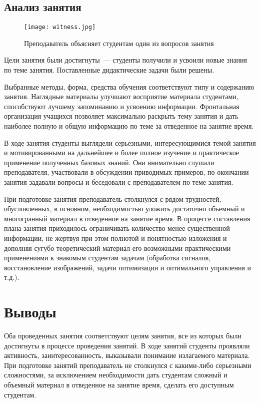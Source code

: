 \begin{refsection}
\subsection{Анализ занятия}

    \begin{figure}[h]
        \centering
        \texttt{[image: witness.jpg]}
        \caption{Преподаватель объясняет студентам один из вопросов занятия}
    \end{figure}

    Цели занятия были достигнуты~--- студенты получили и усвоили новые знания по теме занятия. Поставленные дидактические задачи были решены.

    Выбранные методы, форма, средства обучения соответствуют типу и содержанию занятия. Наглядные материалы улучшают восприятие материала студентами, способствуют лучшему запоминанию и усвоению информации. Фронтальная организация учащихся позволяет максимально раскрыть тему занятия и дать наиболее полную и общую информацию по теме за отведенное на занятие время.

    В ходе занятия студенты выглядели серьезными, интересующимися темой занятия и мотивированными на дальнейшее и более полное изучение и практическое применение полученных базовых знаний. Они внимательно слушали преподавателя, участвовали в обсуждении приводимых примеров, по окончании занятия задавали вопросы и беседовали с преподавателем по теме занятия.

    При подготовке занятия преподаватель столкнулся с рядом трудностей, обусловленных, в основном, необходимостью уложить достаточно объемный и многогранный материал в отведенное на занятие время. В процессе составления плана занятия приходилось ограничивать количество менее существенной информации, не жертвуя при этом полнотой и понятностью изложения и дополняя сугубо теоретический материал его возможными практическими применениями к знакомым студентам задачам (обработка сигналов, восстановление изображений, задачи оптимизации и оптимального управления и т.д.).

\nocite{*}\printbibliography[heading=lessonbib, keyword={lesson2}]

\end{refsection}

\section*{Выводы}

Оба проведенных занятия соответствуют целям занятия, все из которых были достигнуты в процессе проведения занятий. В ходе занятий студенты проявляли активность, заинтересованность, выказывали понимание излагаемого материала. При подготовке занятий преподаватель не столкнулся с какими-либо серьезными сложностями, за исключением необходимости дать студентам сложный и объемный материал в отведенное на занятие время, сделать его доступным студентам.
